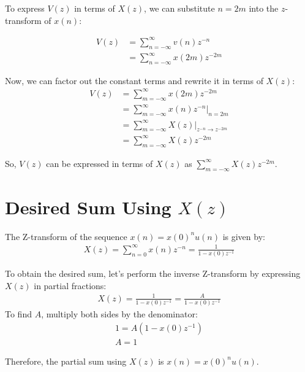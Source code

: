 \documentclass{article}
\begin{document}
To express \(V(z)\) in terms of \(X(z)\), we can substitute \(n=2m\) into the \(z\)-transform of \(x(n)\):


\begin{align}
V(z) & = \sum_{n=-\infty}^{\infty} v(n)z^{-n} \\
     & = \sum_{n=-\infty}^{\infty} x(2m)z^{-2m}
\end{align}

Now, we can factor out the constant terms and rewrite it in terms of \(X(z)\):
\begin{align}
V(z) & = \sum_{m=-\infty}^{\infty} x(2m)z^{-2m} \\
     & = \sum_{m=-\infty}^{\infty} x(n)z^{-n} \Bigg|_{n=2m} \\
     & = \sum_{m=-\infty}^{\infty} X(z) \Bigg|_{z^{-n} \rightarrow z^{-2m}} \\
     & = \sum_{m=-\infty}^{\infty} X(z)z^{-2m}
\end{align}


So, \(V(z)\) can be expressed in terms of \(X(z)\) as \(\sum_{m=-\infty}^{\infty} X(z)z^{-2m}\).

\section*{Desired Sum Using $X(z)$}
The Z-transform of the sequence \( x(n) = x(0)^n u(n) \) is given by:
\begin{align}
X(z) = \sum_{n=0}^{\infty} x(n)z^{-n} = \frac{1}{1 - x(0)z^{-1}} 
\end{align}

To obtain the desired sum, let's perform the inverse Z-transform by expressing \( X(z) \) in partial fractions:
\begin{align}
X(z) = \frac{1}{1 - x(0)z^{-1}} = \frac{A}{1 - x(0)z^{-1}} 
\end{align}
To find \(A\), multiply both sides by the denominator:
\begin{align}
1 = A(1 - x(0)z^{-1}) \\
A=1
\end{align}

Therefore, the partial sum using \(X(z)\) is \(x(n) = x(0)^n u(n)\).
\end{document}
